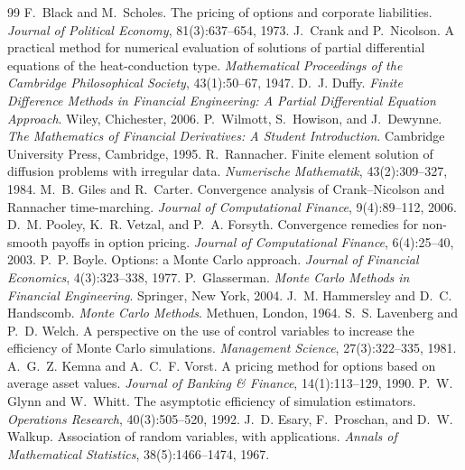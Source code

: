 \documentclass[11pt,a4paper]{article}
\begin{document}
\begingroup
\small
\begin{thebibliography}{99}
 F.~Black and M.~Scholes. The pricing of options and corporate liabilities. \emph{Journal of Political Economy}, 81(3):637--654, 1973.
 J.~Crank and P.~Nicolson. A practical method for numerical evaluation of solutions of partial differential equations of the heat-conduction type. \emph{Mathematical Proceedings of the Cambridge Philosophical Society}, 43(1):50--67, 1947.
 D.~J. Duffy. \emph{Finite Difference Methods in Financial Engineering: A Partial Differential Equation Approach}. Wiley, Chichester, 2006.
 P.~Wilmott, S.~Howison, and J.~Dewynne. \emph{The Mathematics of Financial Derivatives: A Student Introduction}. Cambridge University Press, Cambridge, 1995.
 R.~Rannacher. Finite element solution of diffusion problems with irregular data. \emph{Numerische Mathematik}, 43(2):309--327, 1984.
 M.~B. Giles and R.~Carter. Convergence analysis of Crank--Nicolson and Rannacher time-marching. \emph{Journal of Computational Finance}, 9(4):89--112, 2006.
 D.~M. Pooley, K.~R. Vetzal, and P.~A. Forsyth. Convergence remedies for non-smooth payoffs in option pricing. \emph{Journal of Computational Finance}, 6(4):25--40, 2003.
 P.~P. Boyle. Options: a Monte Carlo approach. \emph{Journal of Financial Economics}, 4(3):323--338, 1977.
 P.~Glasserman. \emph{Monte Carlo Methods in Financial Engineering}. Springer, New York, 2004.
 J.~M. Hammersley and D.~C. Handscomb. \emph{Monte Carlo Methods}. Methuen, London, 1964.
 S.~S. Lavenberg and P.~D. Welch. A perspective on the use of control variables to increase the efficiency of Monte Carlo simulations. \emph{Management Science}, 27(3):322--335, 1981.
 A.~G.~Z. Kemna and A.~C.~F. Vorst. A pricing method for options based on average asset values. \emph{Journal of Banking \& Finance}, 14(1):113--129, 1990.
 P.~W. Glynn and W.~Whitt. The asymptotic efficiency of simulation estimators. \emph{Operations Research}, 40(3):505--520, 1992.
 J.~D. Esary, F.~Proschan, and D.~W. Walkup. Association of random variables, with applications. \emph{Annals of Mathematical Statistics}, 38(5):1466--1474, 1967.

\end{thebibliography}
\end{document}
